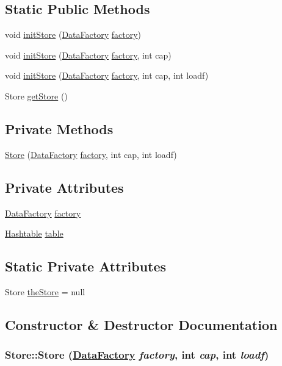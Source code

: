 \subsection*{Static Public Methods}
\begin{CompactItemize}
\item 
void \hyperlink{classStore_d0}{init\-Store} (\hyperlink{interfaceDataFactory}{Data\-Factory} \hyperlink{classStore_o0}{factory})
\item 
void \hyperlink{classStore_d1}{init\-Store} (\hyperlink{interfaceDataFactory}{Data\-Factory} \hyperlink{classStore_o0}{factory}, int cap)
\item 
void \hyperlink{classStore_d2}{init\-Store} (\hyperlink{interfaceDataFactory}{Data\-Factory} \hyperlink{classStore_o0}{factory}, int cap, int loadf)
\item 
Store \hyperlink{classStore_d3}{get\-Store} ()
\end{CompactItemize}
\subsection*{Private Methods}
\begin{CompactItemize}
\item 
\hyperlink{classStore_c0}{Store} (\hyperlink{interfaceDataFactory}{Data\-Factory} \hyperlink{classStore_o0}{factory}, int cap, int loadf)
\end{CompactItemize}
\subsection*{Private Attributes}
\begin{CompactItemize}
\item 
\hyperlink{interfaceDataFactory}{Data\-Factory} \hyperlink{classStore_o0}{factory}
\item 
\hyperlink{classHashtable}{Hashtable} \hyperlink{classStore_o1}{table}
\end{CompactItemize}
\subsection*{Static Private Attributes}
\begin{CompactItemize}
\item 
Store \hyperlink{classStore_r0}{the\-Store} = null
\end{CompactItemize}


\subsection{Constructor \& Destructor Documentation}
\hypertarget{classStore_c0}{
\subsubsection[Store]{\setlength{\rightskip}{0pt plus 5cm}Store::Store (\hyperlink{interfaceDataFactory}{Data\-Factory} {\em factory}, int {\em cap}, int {\em loadf})}}
\label{classStore_c0}




